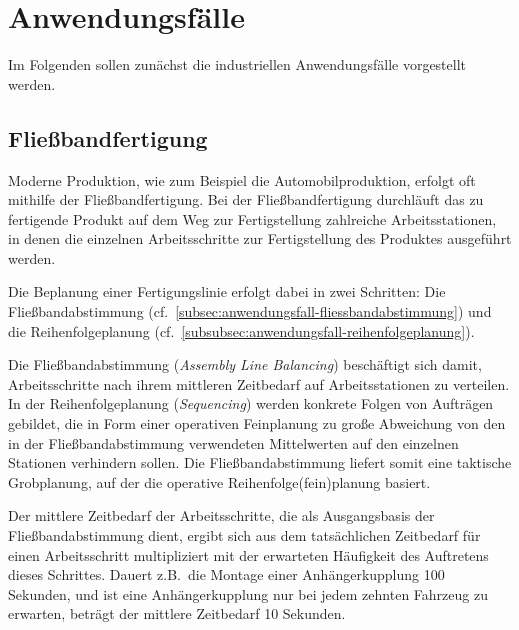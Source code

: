 \section{Anwendungsfälle}

Im Folgenden sollen zunächst die industriellen Anwendungsfälle vorgestellt werden.

\subsection{Fließbandfertigung}\label{subsec:fliessbandfertigung}

Moderne Produktion, wie zum Beispiel die Automobilproduktion, erfolgt oft mithilfe der Fließbandfertigung.
Bei der Fließbandfertigung durchläuft das zu fertigende Produkt auf dem Weg zur Fertigstellung zahlreiche
Arbeitsstationen, in denen die einzelnen Arbeitsschritte zur Fertigstellung des Produktes ausgeführt werden.

Die Beplanung einer Fertigungslinie erfolgt dabei in zwei Schritten:
Die Fließbandabstimmung (cf.\ \cref{subsec:anwendungsfall-fliessbandabstimmung}) und die Reihenfolgeplanung
(cf.\ \cref{subsubsec:anwendungsfall-reihenfolgeplanung}).

Die Fließbandabstimmung (\emph{Assembly Line Balancing}) beschäftigt sich damit,
Arbeitsschritte nach ihrem mittleren Zeitbedarf auf Arbeitsstationen zu verteilen.
In der Reihenfolgeplanung (\emph{Sequencing}) werden konkrete Folgen von Aufträgen gebildet,
die in Form einer operativen Feinplanung zu große Abweichung von den in der
Fließbandabstimmung verwendeten Mittelwerten auf den einzelnen Stationen verhindern sollen.
Die Fließbandabstimmung liefert somit eine taktische Grobplanung,
auf der die operative Reihenfolge(fein)planung basiert.

Der mittlere Zeitbedarf der Arbeitsschritte, die als Ausgangsbasis der Fließbandabstimmung dient,
ergibt sich aus dem tatsächlichen Zeitbedarf für einen Arbeitsschritt multipliziert
mit der erwarteten Häufigkeit des Auftretens dieses Schrittes.
Dauert z.B.\ die Montage einer Anhängerkupplung 100 Sekunden,
und ist eine Anhängerkupplung nur bei jedem zehnten Fahrzeug zu erwarten,
beträgt der mittlere Zeitbedarf 10 Sekunden.




